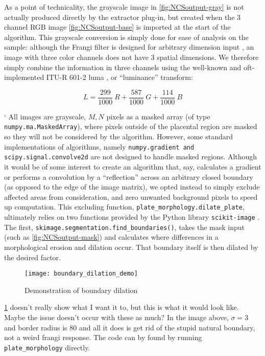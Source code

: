 	As a point of technicality, the grayscale image in \cref{fig:NCSoutput-gray} is not actually produced directly by the extractor plug-in, but created when the 3 channel RGB image \cref{fig:NCSoutput-base} is imported at the start of the algorithm. This grayscale conversion is simply done for ease of analysis on the sample: although the Frangi filter is designed for arbitrary dimension input \cite{frangi1998multiscale}, an image with three color channels does not have 3 spatial dimensions. We therefore simply combine the information in three channels using the well-known and oft-implemented ITU-R 601-2 luma \cite{scipy}, or ``luminance'' transform:
	
	\begin{equation} \label{eq:luma_transform}
	L =  \frac{299}{1000}\ R + \frac{587}{1000}\ G + \frac{114}{1000}\ B
	\end{equation}

`	All images are grayscale, $M,N$ pixels as a masked array (of type
	\texttt{numpy.ma.MaskedArray}), where pixels outside of the placental region are masked so they will not be considered by the algorithm. However, some standard
	implementations of algorithms, namely \texttt{numpy.gradient and scipy.signal.convolve2d} are not designed to handle masked regions. Although it would be of some interest to create an algorithm that, say, calculates a gradient or performs a convolution by a ``reflection'' across an arbitrary closed boundary (as opposed to the edge of the image matrix), we opted instead to simply exclude affected areas from consideration, and zero unwanted background pixels to speed up computation. This excluding function,
	\texttt{plate\_morphology.dilate\_plate}, ultimately relies on two functions
	provided by the Python library \texttt{scikit-image} \cite{skimage}. The first, \texttt{skimage.segmentation.find\_boundaries()}, takes the mask input (such as \cref{fig:NCSoutput-mask}) and calculates where differences in a morphological erosion and dilation occur. That boundary itself is then dilated by the desired factor.
	
	\begin{figure} \label{fig:boundary-demo}
		\texttt{[image: boundary\_dilation\_demo]}
		\caption{Demonstration of boundary dilation}
	\end{figure}
	
	\cref{fig:boundary-demo} doesn't really show what I want it to, but this is what it would look like. Maybe the issue doesn't occur with these as much?
	In the image above, $\sigma=3$ and border radius is 80 and all it does is get
	rid of the stupid natural boundary, not a weird frangi response.
	The code can by found by running \texttt{plate\_morphology} directly.
